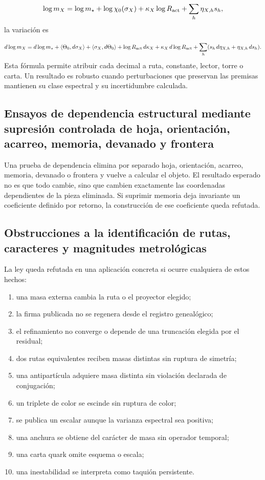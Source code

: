 \[
 \log m_X=
 \log m_\star+
 \log\chi_0(\sigma_X)
 +\kappa_X\log R_{\rm act}
 +\sum_h\eta_{X,h}s_h,
\]
la variación es

\[
 d\log m_X
 =d\log m_\star
 +\langle\Theta_0,d\sigma_X\rangle
 +\langle\sigma_X,d\Theta_0\rangle
 +\log R_{\rm act}\,d\kappa_X
 +\kappa_X\,d\log R_{\rm act}
 +\sum_h(s_h\,d\eta_{X,h}+\eta_{X,h}\,ds_h).
\]
Esta fórmula permite atribuir cada decimal a ruta, constante, lector, torre o carta. Un resultado es robusto cuando perturbaciones que preservan las premisas mantienen su clase espectral y su incertidumbre calculada.

\subsection{Ensayos de dependencia estructural mediante supresión controlada de hoja, orientación, acarreo, memoria, devanado y frontera}
Una prueba de dependencia elimina por separado hoja, orientación, acarreo, memoria, devanado o frontera y vuelve a calcular el objeto. El resultado esperado no es que todo cambie, sino que cambien exactamente las coordenadas dependientes de la pieza eliminada. Si suprimir memoria deja invariante un coeficiente definido por retorno, la construcción de ese coeficiente queda refutada.

\subsection{Obstrucciones a la identificación de rutas, caracteres y magnitudes metrológicas}
La ley queda refutada en una aplicación concreta si ocurre cualquiera de estos hechos:

\begin{enumerate}
\item una masa externa cambia la ruta o el proyector elegido;
\item la firma publicada no se regenera desde el registro genealógico;
\item el refinamiento no converge o depende de una truncación elegida por el residual;
\item dos rutas equivalentes reciben masas distintas sin ruptura de simetría;
\item una antipartícula adquiere masa distinta sin violación declarada de conjugación;
\item un triplete de color se escinde sin ruptura de color;
\item se publica un escalar aunque la varianza espectral sea positiva;
\item una anchura se obtiene del carácter de masa sin operador temporal;
\item una carta quark omite esquema o escala;
\item una inestabilidad se interpreta como taquión persistente.
\end{enumerate}
